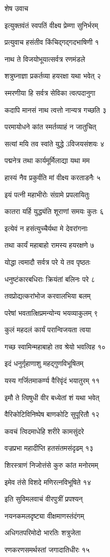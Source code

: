 शेष उवाच

इत्युक्तवंतं स्वपतिं वीक्ष्य प्रेम्णा सुनिर्भरम्

प्रत्युवाच हसंतीव किंचिद्गद्गदभाषिणी १

नाथ ते विजयोभूयात्सर्वत्र रणमंडले

शत्रुघ्नाज्ञा प्रकर्तव्या हयरक्षा यथा भवेत् २

स्मरणीया हि सर्वत्र सेविका त्वत्पदानुगा

कदापि मानसं नाथ त्वत्तो नान्यत्र गच्छति ३

परमायोधने कांत स्मर्तव्याहं न जातुचित्

सत्यां मयि तव स्वांते युद्धे 3विजयसंशयः ४

पद्मनेत्र तथा कार्यमूर्मिलाद्या यथा मम

हास्यं नैव प्रकुर्वंति मां वीक्ष्य करताडनैः ५

इयं पत्नी महाभीरोः संग्रामे प्रपलायितुः

कातरा यर्हि युद्ध्यंति शूराणां समयः कुतः ६

इत्येवं न हसंत्युच्चैर्यथा मे देवरांगनाः

तथा कार्यं महाबाहो रामस्य हयरक्षणे ७

योद्धा त्वमादौ सर्वत्र परे ये तव पृष्ठतः

धनुष्टंकारबधिराः क्रियंतां बलिनः परे ८

तवप्रोद्यत्करांभोज करवालभिया बलम्

परेषां भवतात्क्षिप्रमन्योन्य भयव्याकुलम् ९

कुलं महदलं कार्यं परान्विजयता त्वया

गच्छ स्वामिन्महाबाहो तव श्रेयो भवत्विह १०

इदं धनुर्गृहाणाशु महद्गुणविभूषितम्

यस्य गर्जितमाकर्ण्य वैरिवृंदं भयातुरम् ११

इमौ ते त्विषुधी वीर बध्येतां शं यथा भवेत्

वैरिकोटिविनिष्पेष बाणकोटि सुपूरितौ १२

कवचं त्विदमाधेहि शरीरे कामसुंदरे

वज्रप्रभा महादीप्ति हतसंतमसंदृढम् १३

शिरस्त्राणं निजोत्तंसे कुरु कांत मनोरमम्

इमेव तंसे विशदे मणिरत्नविभूषिते १४

इति सुविमलवाचं वीरपुत्रीं प्रपश्यन्

नयनकमलदृष्ट्या वीक्षमाणस्तंदंगम्

अधिगतपरिमोदो भारतिः शत्रुजेता

रणकरणसमर्थस्तां जगादातिधीरः १५

